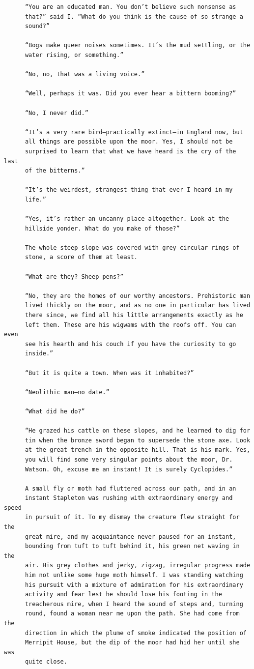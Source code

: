 \documentclass{article}
\begin{document}
\begin{verbatim}
      “You are an educated man. You don’t believe such nonsense as
      that?” said I. “What do you think is the cause of so strange a
      sound?”

      “Bogs make queer noises sometimes. It’s the mud settling, or the
      water rising, or something.”

      “No, no, that was a living voice.”

      “Well, perhaps it was. Did you ever hear a bittern booming?”

      “No, I never did.”

      “It’s a very rare bird—practically extinct—in England now, but
      all things are possible upon the moor. Yes, I should not be
      surprised to learn that what we have heard is the cry of the last
      of the bitterns.”

      “It’s the weirdest, strangest thing that ever I heard in my
      life.”

      “Yes, it’s rather an uncanny place altogether. Look at the
      hillside yonder. What do you make of those?”

      The whole steep slope was covered with grey circular rings of
      stone, a score of them at least.

      “What are they? Sheep-pens?”

      “No, they are the homes of our worthy ancestors. Prehistoric man
      lived thickly on the moor, and as no one in particular has lived
      there since, we find all his little arrangements exactly as he
      left them. These are his wigwams with the roofs off. You can even
      see his hearth and his couch if you have the curiosity to go
      inside.”

      “But it is quite a town. When was it inhabited?”

      “Neolithic man—no date.”

      “What did he do?”

      “He grazed his cattle on these slopes, and he learned to dig for
      tin when the bronze sword began to supersede the stone axe. Look
      at the great trench in the opposite hill. That is his mark. Yes,
      you will find some very singular points about the moor, Dr.
      Watson. Oh, excuse me an instant! It is surely Cyclopides.”

      A small fly or moth had fluttered across our path, and in an
      instant Stapleton was rushing with extraordinary energy and speed
      in pursuit of it. To my dismay the creature flew straight for the
      great mire, and my acquaintance never paused for an instant,
      bounding from tuft to tuft behind it, his green net waving in the
      air. His grey clothes and jerky, zigzag, irregular progress made
      him not unlike some huge moth himself. I was standing watching
      his pursuit with a mixture of admiration for his extraordinary
      activity and fear lest he should lose his footing in the
      treacherous mire, when I heard the sound of steps and, turning
      round, found a woman near me upon the path. She had come from the
      direction in which the plume of smoke indicated the position of
      Merripit House, but the dip of the moor had hid her until she was
      quite close.


\end{verbatim}
\end{document}
